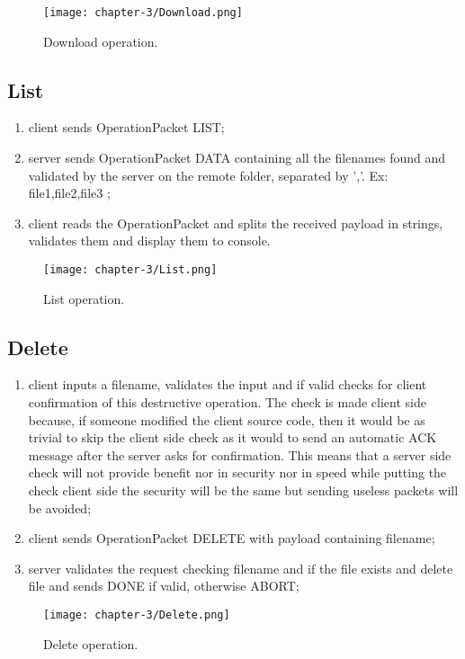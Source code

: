 \begin{figure}[!h] 
    \centering 
    \texttt{[image: chapter-3/Download.png]} 
    \caption{Download operation.}
    \label{fig:download_operation}
\end{figure}
\newpage{}
\subsection{List}
\begin{enumerate}
	\item client sends OperationPacket LIST;
	\item server sends OperationPacket DATA containing all the filenames found and validated by the server on the remote folder, separated by ','. Ex: file1,file2,file3 ;
	\item client reads the OperationPacket and splits the received payload in strings, validates them and display them to console.
	
\end{enumerate}
\begin{figure}[!h] 
    \centering 
    \texttt{[image: chapter-3/List.png]} 
    \caption{List operation.}
    \label{fig:list_operation}
\end{figure}

\subsection{Delete}
\begin{enumerate}
	\item client inputs a filename, validates the input and if valid checks for client confirmation of this destructive operation. The check is made client side because, if someone modified the client source code, then it would be as trivial to skip the client side check as it would to send an automatic ACK message after the server asks for confirmation. This means that a server side check will not provide benefit nor in security nor in speed while putting the check client side the security will be the same but sending useless packets will be avoided;
	\item client sends OperationPacket DELETE with payload containing filename;
	\item server validates the request checking filename and if the file exists and delete file and sends DONE if valid, otherwise ABORT;
\end{enumerate}

\begin{figure}[!h] 
    \centering 
    \texttt{[image: chapter-3/Delete.png]} 
    \caption{Delete operation.}
    \label{fig:delete_operation}
\end{figure}

